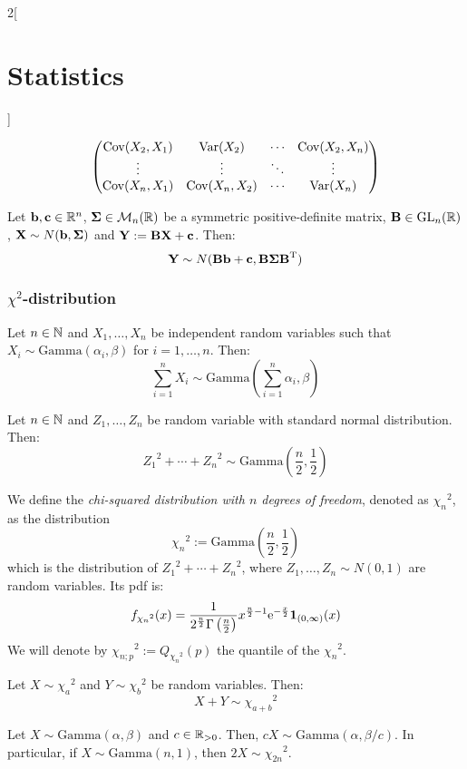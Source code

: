 \documentclass[../../../main_math.tex]{subfiles}
\begin{document}
\begin{multicols}{2}[\section{Statistics}]
\begin{proposition}
\begin{gather*}
\begin{pmatrix}
        \mathrm{Cov}(X_2,X_1) & \mathrm{Var}(X_2)     & \cdots & \mathrm{Cov}(X_2,X_n) \\
        \vdots        & \vdots        & \ddots & \vdots        \\
        \mathrm{Cov}(X_n,X_1) & \mathrm{Cov}(X_n,X_2) & \cdots & \mathrm{Var}(X_n)     \\
      \end{pmatrix}
    \end{gather*}
  \end{proposition}
  \begin{proposition}
    Let $\boldsymbol{\mathrm{b}},\boldsymbol{\mathrm{c}}\in\mathbb{R}^n$, $\boldsymbol{\mathrm{\Sigma}}\in\mathcal{M}_n(\mathbb{R})$ be a symmetric positive-definite matrix, $\boldsymbol{\mathrm{B}}\in\mathrm{GL}_n(\mathbb{R})$, $\boldsymbol{\mathrm{X}}\sim N(\boldsymbol{\mathrm{b}},\boldsymbol{\mathrm{\Sigma}})$ and $\boldsymbol{\mathrm{Y}}:=\boldsymbol{\mathrm{BX}}+\boldsymbol{\mathrm{c}}$. Then: $$\boldsymbol{\mathrm{Y}}\sim N(\boldsymbol{\mathrm{Bb}}+\boldsymbol{\mathrm{c}},\boldsymbol{\mathrm{B\Sigma}}{\boldsymbol{\mathrm{B}}}^{\mathrm{T}})$$
  \end{proposition}
  \subsubsection{\texorpdfstring{$\chi^2$}{chi2}-distribution}
  \begin{proposition}
    Let $n\in\mathbb{N}$ and $X_1,\ldots,X_n$ be independent random variables such that $X_i\sim \text{Gamma}(\alpha_i,\beta)$ for $i=1,\ldots,n$. Then: $$\sum_{i=1}^nX_i\sim\text{Gamma}\left(\sum_{i=1}^n\alpha_i,\beta\right)$$
  \end{proposition}
  \begin{corollary}
    Let $n\in\mathbb{N}$ and $Z_1,\ldots,Z_n$ be \iid random variable with standard normal distribution. Then: $${Z_1}^2+\cdots+{Z_n}^2\sim\text{Gamma}\left(\frac{n}{2},\frac{1}{2}\right)$$
  \end{corollary}
  \begin{definition}
    We define the \emph{chi-squared distribution with $n$ degrees of freedom}, denoted as ${\chi_n}^2$, as the distribution $${\chi_n}^2:=\text{Gamma}\left(\frac{n}{2},\frac{1}{2}\right)$$ which is the distribution of ${Z_1}^2+\cdots+{Z_n}^2$, where $Z_1,\ldots,Z_n\sim N(0,1)$ are \iid random variables. Its pdf is:
    $$f_{{\chi_n}^2}(x)=\frac{1}{2^\frac{n}{2}\Gamma\left(\frac{n}{2}\right)}x^{\frac{n}{2}-1}\mathrm{e}^{-\frac{x}{2}}\boldsymbol{\mathrm{1}}_{(0,\infty)}(x)$$
    We will denote by ${\chi_{n;p}}^2:=Q_{{\chi_n}^2}(p)$ the quantile of the ${\chi_n}^2$.
  \end{definition}
  \begin{proposition}
    Let $X\sim{\chi_a}^2$ and $Y\sim{\chi_b}^2$ be \iid random variables. Then: $$X+Y\sim{\chi_{a+b}}^2$$
  \end{proposition}
  \begin{proposition}
    Let $X\sim\text{Gamma}(\alpha,\beta)$ and $c\in\mathbb{R}_{>0}$. Then, $cX\sim\text{Gamma}(\alpha,\beta/c)$. In particular, if $X\sim\text{Gamma}(n,1)$, then $2X\sim {\chi_{2n}}^2$.
  \end{proposition}

\end{multicols}
\end{document}
